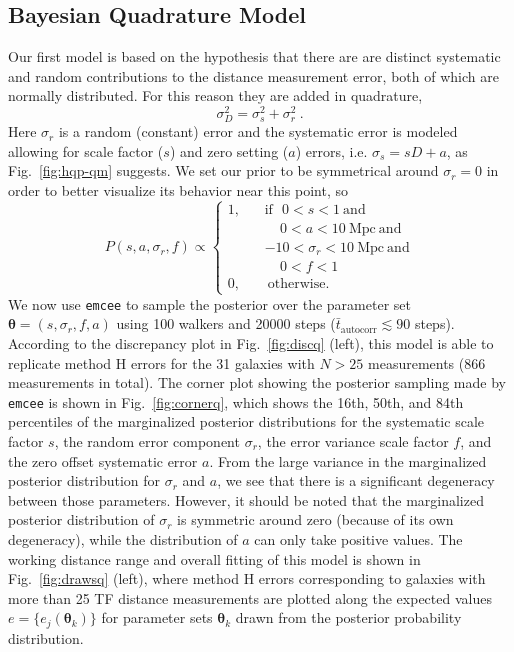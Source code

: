 \documentclass[a4paper,fleqn,usenatbib]{mnras}
\begin{document}
\subsection{Bayesian Quadrature Model}
\label{sec:bqm} 

Our first model is based on the hypothesis that there are are distinct systematic and random contributions to the distance measurement error, both of which are normally distributed. For this reason they are added in quadrature, 
\begin{equation}
\sigma_D^2=\sigma_s^2+\sigma_r^2\ .
	\label{eq:bayq}
\end{equation}
Here $\sigma_r$ is a random (constant) error and the systematic error is modeled allowing for scale factor ($s$) and zero setting ($a$) errors, i.e.  $\sigma_s=sD+a$, as Fig.~\ref{fig:hqp-qm} suggests.  We set our prior to be symmetrical around $\sigma_r=0$ in order to better visualize its behavior near this point, so
\begin{equation}
P(s,a,\sigma_r,f)\propto\left\{
\begin{aligned}
1,\ \ \ \ &\mathrm{if}\ \ \ 0<s<1\ \mathrm{and}\\
& \ \ \ \ \  0<a<10\ \mathrm{Mpc}\ \mathrm{and}\\
&-10<\sigma_r<10\ \mathrm{Mpc}\ \mathrm{and}\\
& \ \ \ \ \  0<f<1\\
0,\ \ \ \ &\ \mathrm{otherwise.}
\end{aligned}
\right.
	\label{eq:priorq}
\end{equation}
We now use \texttt{emcee} to sample the posterior over the parameter set $\pmb{\theta}=(s,\sigma_r,f,a)$ using 100 walkers and 20000 steps ($\bar{t}_\mathrm{autocorr} \lesssim 90$ steps). According to the discrepancy plot in Fig.~\ref{fig:discq} (left), this model is able to replicate method H errors for the 31 galaxies with $N>25$ measurements (866 measurements in total). The corner plot showing the posterior sampling made by \texttt{emcee} is shown in Fig.~\ref{fig:cornerq}, which shows the 16th, 50th, and 84th percentiles of the marginalized posterior distributions for the systematic scale factor $s$, the random error component $\sigma_r$, the error variance scale factor $f$, and the zero offset systematic error $a$. From the large variance in the marginalized posterior distribution for $\sigma_r$ and $a$, we see that there is a significant degeneracy between those parameters. However, it should be noted that the marginalized posterior distribution of $\sigma_r$ is symmetric around zero (because of its own degeneracy), while the distribution of $a$ can only take positive values. The working distance range and overall fitting of this model is shown in Fig.~\ref{fig:drawsq} (left), where method H errors corresponding to galaxies with more than 25 TF distance measurements are plotted along the expected values $e=\{e_j(\pmb{\theta}_k)\}$ for parameter sets $\pmb{\theta}_k$ drawn from the posterior probability distribution. 
\end{document}
